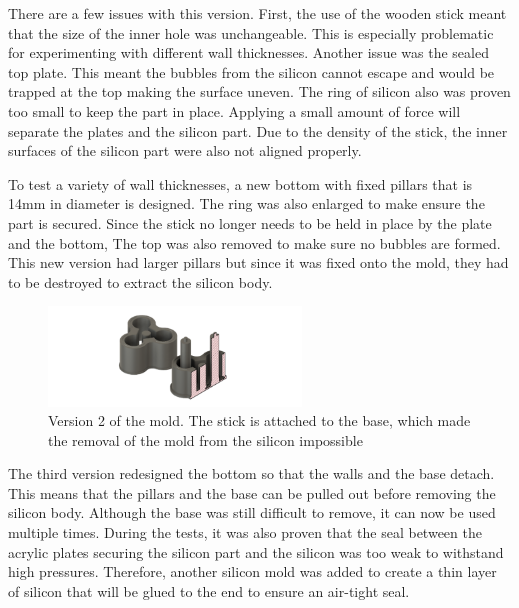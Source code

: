 \documentclass[twoside, 11pt]{article}
\begin{document}
There are a few issues with this version. First, the use of the wooden stick meant that the size of the inner hole was unchangeable. This is especially problematic for experimenting with different wall thicknesses. Another issue was the sealed top plate. This meant the bubbles from the silicon cannot escape and would be trapped at the top making the surface uneven. The ring of silicon also was proven too small to keep the part in place. Applying a small amount of force will separate the plates and the silicon part. Due to the density of the stick, the inner surfaces of the silicon part were also not aligned properly. 

To test a variety of wall thicknesses, a new bottom with fixed pillars that is 14mm in diameter is designed. The ring was also enlarged to make ensure the part is secured. Since the stick no longer needs to be held in place by the plate and the bottom, The top was also removed to make sure no bubbles are formed. This new version had larger pillars but since it was fixed onto the mold, they had to be destroyed to extract the silicon body. 

\begin{figure} [H]
\centering
\includegraphics[width=0.6\textwidth]{mold v2}
\caption{Version 2 of the mold. The stick is attached to the base, which made the removal of the mold from the silicon impossible}
\end{figure}

The third version redesigned the bottom so that the walls and the base detach. This means that the pillars and the base can be pulled out before removing the silicon body. Although the base was still difficult to remove, it can now be used multiple times. During the tests, it was also proven that the seal between the acrylic plates securing the silicon part and the silicon was too weak to withstand high pressures. Therefore, another silicon mold was added to create a thin layer of silicon that will be glued to the end to ensure an air-tight seal. 
\end{document}

